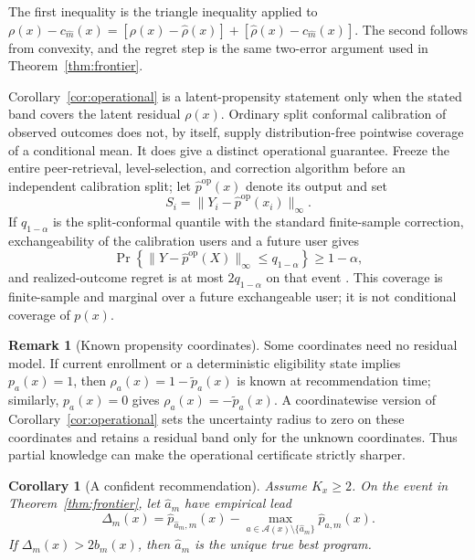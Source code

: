 \documentclass[11pt]{article}
\makeatletter
\theoremstyle{noteplain}
\newtheorem{corollary}[theorem]{Corollary}
\theoremstyle{definition}
\newtheorem{remark}[theorem]{Remark}
\renewenvironment{proof}[1][\proofname]{\par
  \pushQED{\qed}%
  \normalfont \topsep5\p@\@plus5\p@\relax
  \trivlist
  \item[\hskip\labelsep\bfseries #1\@addpunct{.}]\ignorespaces
}{%
  \popQED\endtrivlist\@endpefalse
}
\newcommand{\cA}{\mathcal A}
\makeatother
\begin{document}
\begin{proof}
The first inequality is the triangle inequality applied to
$\rho(x)-c_{\widehat m}(x)=[\rho(x)-\widehat\rho(x)]+[\widehat\rho(x)-c_{\widehat m}(x)]$.
The second follows from convexity, and the regret step is the same two-error argument used in Theorem~\ref{thm:frontier}.
\end{proof}

Corollary~\ref{cor:operational} is a latent-propensity statement only when the stated band covers the latent residual $\rho(x)$. Ordinary split conformal calibration of observed outcomes does not, by itself, supply distribution-free pointwise coverage of a conditional mean. It does give a distinct operational guarantee. Freeze the entire peer-retrieval, level-selection, and correction algorithm before an independent calibration split; let $\widehat p^{\mathrm{op}}(x)$ denote its output and set
\[
 S_i=\|Y_i-\widehat p^{\mathrm{op}}(x_i)\|_\infty.
\]
If $q_{1-\alpha}$ is the split-conformal quantile with the standard finite-sample correction, exchangeability of the calibration users and a future user gives
\begin{equation}\label{eq:conformal-operational}
 \Pr\!\left\{
 \|Y-\widehat p^{\mathrm{op}}(X)\|_\infty\leq q_{1-\alpha}
 \right\}\geq1-\alpha,
\end{equation}
and realized-outcome regret is at most $2q_{1-\alpha}$ on that event \cite{shafer}. This coverage is finite-sample and marginal over a future exchangeable user; it is not conditional coverage of $p(x)$.

\begin{remark}[Known propensity coordinates]\label{rem:known}
Some coordinates need no residual model. If current enrollment or a deterministic eligibility state implies $p_a(x)=1$, then $\rho_a(x)=1-\widetilde p_a(x)$ is known at recommendation time; similarly, $p_a(x)=0$ gives $\rho_a(x)=-\widetilde p_a(x)$. A coordinatewise version of Corollary~\ref{cor:operational} sets the uncertainty radius to zero on these coordinates and retains a residual band only for the unknown coordinates. Thus partial knowledge can make the operational certificate strictly sharper.
\end{remark}

\begin{corollary}[A confident recommendation]\label{cor:margin}
Assume $K_x\geq2$. On the event in Theorem~\ref{thm:frontier}, let $\widehat a_m$ have empirical lead
\[
 \Delta_m(x)=\widehat p_{\widehat a_m,m}(x)
 -\max_{a\in\cA(x)\setminus\{\widehat a_m\}}\widehat p_{a,m}(x).
\]
If $\Delta_m(x)>2b_m(x)$, then $\widehat a_m$ is the unique true best program.
\end{corollary}
\end{document}
